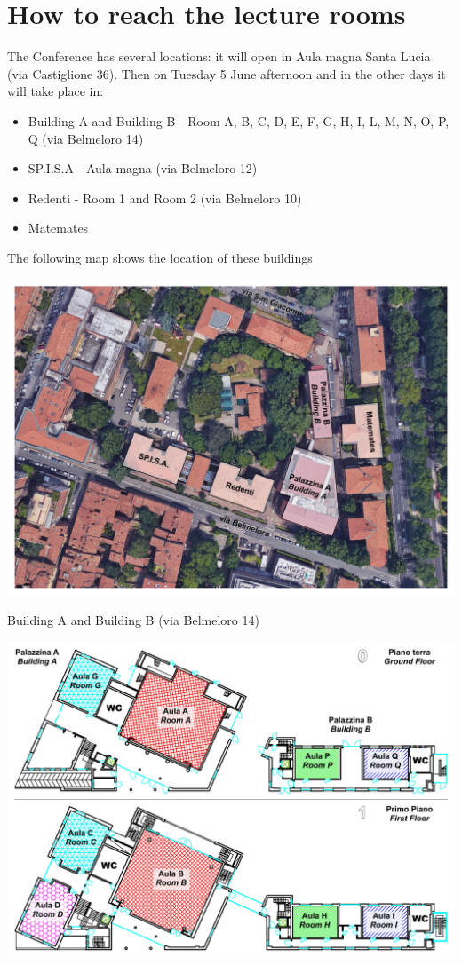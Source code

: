 \section*{How to reach the lecture rooms}
The Conference has several locations: it will open in Aula magna Santa Lucia (via Castiglione 36).
Then on Tuesday 5 June afternoon and in the other days it will take place in:
\begin{itemize}
\item Building A and Building B - Room A, B, C, D, E, F, G, H, I, L, M, N, O, P, Q (via Belmeloro 14)
\item SP.I.S.A - Aula magna (via Belmeloro 12)
\item Redenti - Room 1 and Room 2 (via Belmeloro 10)
\item Matemates
\end{itemize}
The following map shows the location of these buildings

\includegraphics[scale=0.5]{satellite.pdf}
\newpage
\begin{center}
Building A and Building B (via Belmeloro 14) 
\end{center}
\includegraphics[scale=0.55]{Belmeloro14_floor0_1.pdf}

